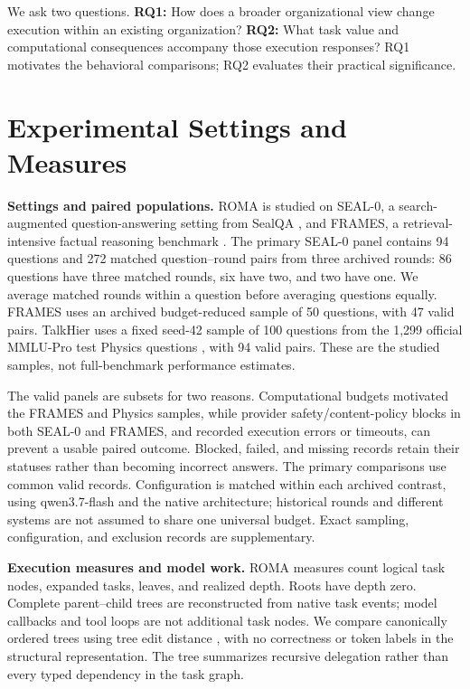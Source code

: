 \documentclass[10pt,letterpaper,twocolumn]{article}
\begin{document}
We ask two questions. \textbf{RQ1:} How does a broad\-er or\-ga\-ni\-za\-tion\-al view change ex\-e\-cu\-tion within an ex\-ist\-ing or\-ga\-ni\-za\-tion? \textbf{RQ2:} What task value and com\-pu\-ta\-tion\-al con\-se\-quences accompany those ex\-e\-cu\-tion responses? RQ1 motivates the behavioral comparisons; RQ2 eval\-u\-ates their practical significance.

\section{Experimental Settings and Measures}
\textbf{Settings and paired populations.} ROMA is studied on SEAL-0, a search-augmented ques\-tion-an\-swer\-ing setting from SealQA \cite{sealqa}, and FRAMES, a retrieval-intensive factual reasoning benchmark \cite{frames}. The primary SEAL-0 panel contains 94 questions and 272 matched ques\-tion--round pairs from three ar\-chived rounds: 86 questions have three matched rounds, six have two, and two have one. We average matched rounds within a ques\-tion before averaging questions equally. FRAMES uses an ar\-chived budget-re\-duced sample of 50 questions, with 47 valid pairs. TalkHier uses a fixed seed-42 sample of 100 questions from the 1,299 official MMLU-Pro test Phys\-ics questions \cite{mmlupro}, with 94 valid pairs. These are the studied samples, not full-benchmark performance es\-ti\-mates.

The valid panels are subsets for two reasons. Computational budgets motivated the FRAMES and Phys\-ics samples, while prov\-id\-er safe\-ty/\allowbreak{}con\-tent-pol\-i\-cy blocks in both SEAL-0 and FRAMES, and re\-cord\-ed ex\-e\-cu\-tion errors or timeouts, can prevent a usable paired out\-come. Blocked, failed, and missing re\-cords retain their statuses rather than becoming incorrect answers. The primary comparisons use common valid re\-cords. Configuration is matched within each ar\-chived con\-trast, using qwen3.7-flash and the na\-tive ar\-chi\-tec\-ture; historical rounds and dif\-fer\-ent sys\-tems are not assumed to share one universal budget. Exact sampling, configuration, and exclusion re\-cords are supplementary.

\textbf{Execution measures and model work.} ROMA mea\-sures count logical task nodes, expanded tasks, leaves, and realized depth. Roots have depth zero. Complete parent--child trees are reconstructed from na\-tive task events; mod\-el callbacks and tool loops are not additional task nodes. We compare canonically ordered trees using tree edit distance \cite{apted}, with no correctness or token labels in the structural representation. The tree summarizes re\-cur\-sive del\-e\-ga\-tion rather than every typed dependency in the task graph.
\end{document}
